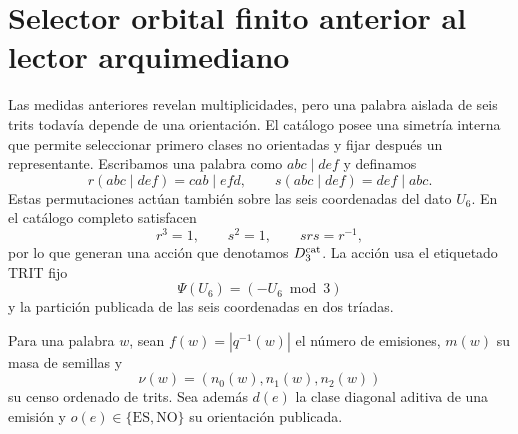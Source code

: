 \section{Selector orbital finito anterior al lector arquimediano}
\label{sec:selector-orbital-constantes}

Las medidas anteriores revelan multiplicidades, pero una palabra aislada de
seis trits todavía depende de una orientación. El catálogo posee una simetría
interna que permite seleccionar primero clases no orientadas y fijar después
un representante. Escribamos una palabra como \(abc\mid def\) y definamos
\[
 r(abc\mid def)=cab\mid efd,
 \qquad
 s(abc\mid def)=def\mid abc.
\]
Estas permutaciones actúan también sobre las seis coordenadas del dato
\(U_6\). En el catálogo completo satisfacen
\[
 r^3=1,
 \qquad s^2=1,
 \qquad srs=r^{-1},
\]
por lo que generan una acción que denotamos \(D_3^{\rm cat}\). La acción usa
el etiquetado TRIT fijo
\[
 \Psi(U_6)=(-U_6\bmod3)
\]
y la partición publicada de las seis coordenadas en dos tríadas.

Para una palabra \(w\), sean \(f(w)=|q^{-1}(w)|\) el número de emisiones,
\(m(w)\) su masa de semillas y
\[
 \nu(w)=(n_0(w),n_1(w),n_2(w))
\]
su censo ordenado de trits. Sea además \(d(e)\) la clase diagonal aditiva de
una emisión y \(o(e)\in\{\mathrm{ES},\mathrm{NO}\}\) su orientación
publicada.

